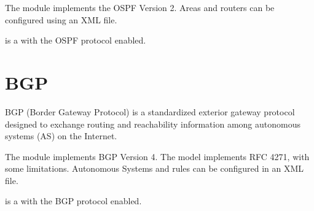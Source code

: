 The  module implements the OSPF Version 2. Areas and routers
can be configured using an XML file.

 is a  with the OSPF protocol enabled.


\section{BGP}
\label{sec:bgp}

BGP (Border Gateway Protocol) is a standardized exterior gateway protocol
designed to exchange routing and reachability information among 
autonomous systems (AS) on the Internet.

The  module implements BGP Version 4. The model implements 
RFC 4271, with some limitations. Autonomous Systems and rules can be
configured in an XML file.

 is a  with the BGP protocol enabled.


